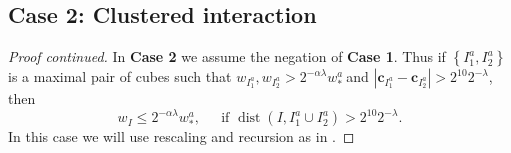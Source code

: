 \documentclass{amsart}%
\theoremstyle{plain}
\numberwithin{equation}{section}
\begin{document}
\subsection{Case 2: Clustered interaction\label{Sub Case 2}}

\begin{proof}
[Proof continued]In \textbf{Case 2} we assume the negation of \textbf{Case 1}.
Thus if $\left\{  I_{1}^{a},I_{2}^{a}\right\}  $ is a maximal pair of cubes
such that $w_{I_{1}^{a}},w_{I_{2}^{a}}>2^{-\alpha\lambda}w_{\ast}^{a}\ $and
$\left\vert \mathbf{c}_{I_{1}^{a}}-\mathbf{c}_{I_{2}^{a}}\right\vert
>2^{10}2^{-\lambda}$, then
\begin{equation}
w_{I}\leq2^{-\alpha\lambda}w_{\ast}^{a},\ \ \ \ \ \text{ if }%
\operatorname*{dist}\left(  I,I_{1}^{a}\cup I_{2}^{a}\right)  >2^{10}%
2^{-\lambda}.\label{small away}%
\end{equation}
In this case we will use rescaling and recursion as in \cite{TaVaVe}.


\end{proof}
\end{document}
